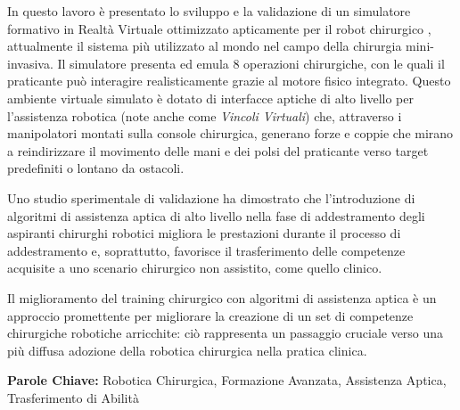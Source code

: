 \documentclass[../main.tex]{subfiles}
\begin{document}
In questo lavoro è presentato lo sviluppo e la validazione di un simulatore formativo in Realtà Virtuale ottimizzato apticamente per il robot chirurgico \davinci, attualmente il sistema più utilizzato al mondo nel campo della chirurgia mini-invasiva. Il simulatore presenta ed emula 8 operazioni chirurgiche, con le quali il praticante può interagire realisticamente grazie al motore fisico integrato. Questo ambiente virtuale simulato è dotato di interfacce aptiche di alto livello per l'assistenza robotica (note anche come \textit{Vincoli Virtuali}) che, attraverso i manipolatori montati sulla console chirurgica, generano forze e coppie che mirano a reindirizzare il movimento delle mani e dei polsi del praticante verso target predefiniti o lontano da ostacoli. 

Uno studio sperimentale di validazione ha dimostrato che l'introduzione di algoritmi di assistenza aptica di alto livello nella fase di addestramento degli aspiranti chirurghi robotici migliora le prestazioni durante il processo di addestramento e, soprattutto, favorisce il trasferimento delle competenze acquisite a uno scenario chirurgico non assistito, come quello clinico. 

Il miglioramento del training chirurgico con algoritmi di assistenza aptica è un approccio promettente per migliorare la creazione di un set di competenze chirurgiche robotiche arricchite: ciò rappresenta un passaggio cruciale verso una più diffusa adozione della robotica chirurgica nella pratica clinica.

\textbf{Parole Chiave:} Robotica Chirurgica, Formazione Avanzata, Assistenza Aptica, Trasferimento di Abilità
\end{document}
